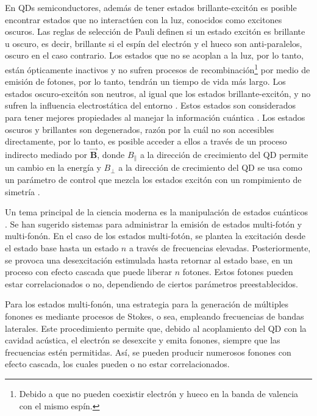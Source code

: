 \documentclass[../main.tex]{subfiles}
\begin{document}
En QDs semiconductores, además de tener estados brillante-excitón es posible encontrar estados que no interactúen con la luz, conocidos como excitones oscuros. Las reglas de selección de Pauli definen si un estado excitón es brillante u oscuro, es decir, brillante si el espín del electrón y el hueco son anti-paralelos, oscuro en el caso contrario. Los estados que no se acoplan a la luz, por lo tanto, están ópticamente inactivos y no sufren procesos de recombinación\footnote{Debido a que no pueden coexistir electrón y hueco en la banda de valencia con el mismo espín.} por medio de emisión de fotones, por lo tanto, tendrán un tiempo de vida más largo. Los estados oscuro-excitón son neutros, al igual que los estados brillante-excitón, y no sufren la influencia electrostática del entorno \parencite{Jimenez2017}. Estos estados son considerados para tener mejores propiedades al manejar la información cuántica \parencite{Poem2010}. Los estados oscuros y brillantes son degenerados, razón por la cuál no son accesibles directamente, por lo tanto, es posible acceder a ellos a través de un proceso indirecto mediado por $\vec{\mathbf{B}}$, donde $B_\parallel$ a la dirección de crecimiento del QD permite un cambio en la energía y $B_\perp$ a la dirección de crecimiento del QD se usa como un parámetro de control que mezcla los estados excitón con un rompimiento de simetría \parencite{Bayer2000}.

Un tema principal de la ciencia moderna es la manipulación de estados cuánticos \parencite{Bin2020}. Se han sugerido sistemas para administrar la emisión de estados multi-fotón y multi-fonón. En el caso de los estados multi-fotón, se plantea la excitación desde el estado base hasta un estado $n$ a través de frecuencias elevadas. Posteriormente, se provoca una desexcitación estimulada hasta retornar al estado base, en un proceso con efecto cascada que puede liberar $n$ fotones. Estos fotones pueden estar correlacionados o no, dependiendo de ciertos parámetros preestablecidos.

Para los estados multi-fonón, una estrategia para la generación de múltiples fonones es mediante procesos de Stokes, o sea, empleando frecuencias de bandas laterales. Este procedimiento permite que, debido al acoplamiento del QD con la cavidad acústica, el electrón se desexcite y emita fonones, siempre que las frecuencias estén permitidas. Así, se pueden producir numerosos fonones con efecto cascada, los cuales pueden o no estar correlacionados.
\end{document}
